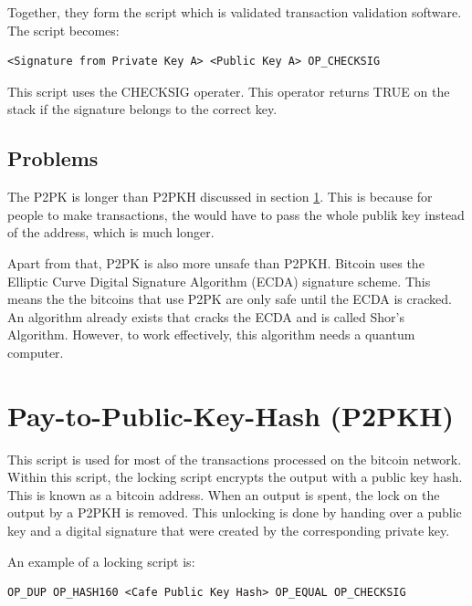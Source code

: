 \documentclass[a4paper, 12pt]{article}
\begin{document}
Together, they form the script which is validated transaction validation software. The script becomes:

\begin{lstlisting}[basicstyle=\ttfamily]
<Signature from Private Key A> <Public Key A> OP_CHECKSIG
\end{lstlisting}

This script uses the CHECKSIG operater. This operator returns TRUE on the stack if the signature belongs to the correct key. \cite{book:1317587}

\subsection{Problems} %
\label{sub:problems}
The P2PK is longer than P2PKH discussed in section \ref{sec:pay_to_public_key_hash_p2pkh}. This is because for people to make transactions, the would have to pass the whole publik key instead of the address, which is much longer. \cite{walker}
\par
Apart from that, P2PK is also more unsafe than P2PKH. Bitcoin uses the Elliptic Curve Digital Signature Algorithm (ECDA) signature scheme. This means the the bitcoins that use P2PK are only safe until the ECDA is cracked. An algorithm already exists that cracks the ECDA and is called Shor's Algorithm. However, to work effectively, this algorithm needs a quantum computer. 


\section{Pay-to-Public-Key-Hash (P2PKH)} %
\label{sec:pay_to_public_key_hash_p2pkh}

This script is used for most of the transactions processed on the bitcoin network. Within this script, the locking script encrypts the output with a public key hash. This is known as a bitcoin address. When an output is spent, the lock on the output by a P2PKH is removed. This unlocking is done by handing over a public key and a digital signature that were created by the corresponding private key.
\par
An example of a locking script is: 
\begin{lstlisting}[basicstyle=\ttfamily]
OP_DUP OP_HASH160 <Cafe Public Key Hash> OP_EQUAL OP_CHECKSIG
\end{lstlisting}
\end{document}
